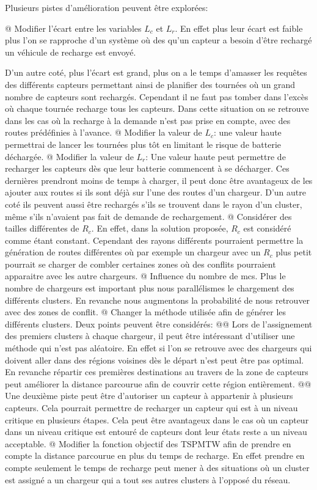 \documentclass[noposter]{polytech}
\begin{document}
	Plusieurs pistes d'amélioration peuvent être explorées:
	\begin{easylist}
		@ Modifier l'écart entre les variables $L_c$ et $L_r$.
		En effet plus leur écart est faible plus l'on se rapproche d'un système où des qu'un capteur a besoin d'être rechargé un véhicule de recharge est envoyé.
		
		D'un autre coté, plus l'écart est grand, plus on a le temps d'amasser les requêtes des différents capteurs permettant ainsi de planifier des tournées où un grand nombre de capteurs sont rechargés.
		Cependant il ne faut pas tomber dans l'excès où chaque tournée recharge tous les capteurs.
		Dans cette situation on se retrouve dans les cas où la recharge à la demande n'est pas prise en compte, avec des routes prédéfinies à l'avance.
		@ Modifier la valeur de $L_c$: une valeur haute permettrai de lancer les tournées plus tôt en limitant le risque de batterie déchargée.
		@ Modifier la valeur de $L_r$: Une valeur haute peut permettre de recharger les capteurs dès que leur batterie commencent à se décharger.
		Ces dernières prendront moins de temps à charger, il peut donc être avantageux de les ajouter aux routes si ils sont déjà sur l'une des routes d'un chargeur.
		D'un autre coté ils peuvent aussi être rechargés s'ils se trouvent dans le rayon d'un cluster, même s'ils n'avaient pas fait de demande de rechargement.
		@ Considérer des tailles différentes de $R_c$.
		En effet, dans la solution proposée, $R_c$ est considéré comme étant constant.
		Cependant des rayons différents pourraient permettre la génération de routes différentes où par exemple un chargeur avec un $R_c$ plus petit pourrait se charger de combler certaines zones où des conflits pourraient apparaitre avec les autre chargeurs.
		@ Influence du nombre de \glspl{mc}.
		Plus le nombre de chargeurs est important plus nous parallélismes le chargement des différents clusters.
		En revanche nous augmentons la probabilité de nous retrouver avec des zones de conflit.
		@ Changer la méthode utilisée afin de générer les différents clusters.
		Deux points peuvent être considérés:
		@@ Lors de l'assignement des premiers clusters à chaque chargeur, il peut être intéressant d'utiliser une méthode qui n'est pas aléatoire.
		En effet si l'on se retrouve avec des chargeurs qui doivent aller dans des régions voisines dès le départ n'est peut être pas optimal.
		En revanche répartir ces premières destinations au travers de la zone de capteurs peut améliorer la distance parcourue afin de couvrir cette région entièrement.
		@@ Une deuxième piste peut être d'autoriser un capteur à appartenir à plusieurs capteurs.
		Cela pourrait permettre de recharger un capteur qui est à un niveau critique en plusieurs étapes.
		Cela peut être avantageux dans le cas où un capteur dans un niveau critique est entouré de capteurs dont leur états reste a un niveau acceptable.
		@ Modifier la fonction objectif des TSPMTW afin de prendre en compte la distance parcourue en plus du temps de recharge.
		En effet prendre en compte seulement le temps de recharge peut mener à des situations où un cluster est assigné a un chargeur qui a tout ses autres clusters à l'opposé du réseau.
		
	\end{easylist}
\end{document}
